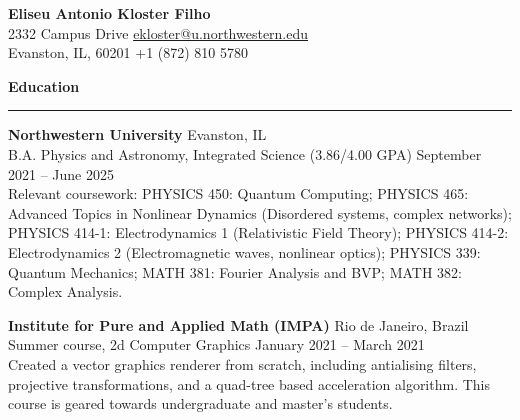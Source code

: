 \documentclass{article}
\begin{document}
\thispagestyle{empty}
\begin{center}
    \LARGE \textbf{Eliseu Antonio Kloster Filho} \\ 
    \large 2332 Campus Drive \hfill \href{mailto:ekloster@u.northwestern.edu}{ekloster@u.northwestern.edu} \\
    Evanston, IL, 60201 \hfill +1 (872) 810 5780
\end{center}

\large \textbf{Education}
\vspace{0.2\baselineskip}
\hrule\normalsize
\textbf{Northwestern University} \hfill Evanston, IL \\
B.A. Physics and Astronomy, Integrated Science (3.86/4.00 GPA) \hfill September 2021 – June 2025\medskip\\
Relevant coursework: PHYSICS 450: Quantum Computing; PHYSICS 465: Advanced Topics in Nonlinear Dynamics (Disordered systems, complex networks); PHYSICS 414-1: Electrodynamics 1 (Relativistic Field Theory); PHYSICS 414-2: Electrodynamics 2 (Electromagnetic waves, nonlinear optics); PHYSICS 339: Quantum Mechanics; MATH 381: Fourier Analysis and BVP; MATH 382: Complex Analysis.

\textbf{Institute for Pure and Applied Math (IMPA)} \hfill Rio de Janeiro, Brazil \\
Summer course, 2d Computer Graphics \hfill January 2021 – March 2021 \\
Created a vector graphics renderer from scratch, including antialising filters, projective transformations, and a quad-tree based acceleration algorithm. This course is geared towards undergraduate and master's students.
\end{document}
